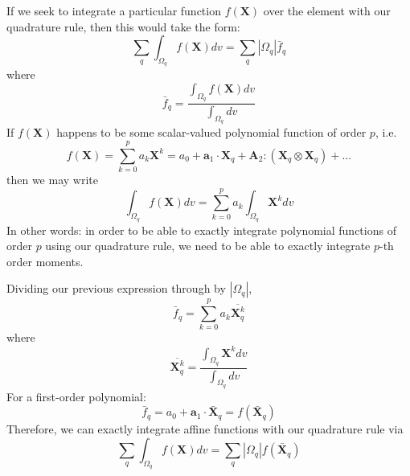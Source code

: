 \documentclass[11pt]{article} %
\begin{document}
If we seek to integrate a particular function $f(\mathbf{X})$ over the element with our quadrature rule, then this would take the form:
\begin{equation}
	\sum_q \int_{\Omega_q} f(\mathbf{X}) dv = \sum_q |\Omega_q| \bar{f}_q
\end{equation}
where
\begin{equation}
	\bar{f}_q = \frac{\int_{\Omega_q} f(\mathbf{X}) dv}{\int_{\Omega_q} dv}
\end{equation}
If $f(\mathbf{X})$ happens to be some scalar-valued polynomial function of order $p$, i.e.
\begin{equation}
	f(\mathbf{X}) = \sum_{k = 0}^{p} a_k \mathbf{X}^k = a_0 + \mathbf{a}_1 \cdot \mathbf{X}_q + \mathbf{A}_2 \colon (\mathbf{X}_q \otimes \mathbf{X}_q) + \ldots
\end{equation}
then we may write
\begin{equation}
	\int_{\Omega_q} f(\mathbf{X}) dv = \sum_{k = 0}^{p} a_k \int_{\Omega_q} \mathbf{X}^k dv
\end{equation}
In other words: in order to be able to exactly integrate polynomial functions of order $p$ using our quadrature rule, we need to be able to exactly integrate $p$-th order moments.

Dividing our previous expression through by $| \Omega_q |$,
\begin{equation}
	\bar{f}_q = \sum_{k = 0}^{p} a_k \overline{\mathbf{X}^k_q}
\end{equation}
where
\begin{equation}
	\overline{\mathbf{X}^k_q} = \frac{\int_{\Omega_q} \mathbf{X}^k dv}{\int_{\Omega_q} dv}
\end{equation}
For a first-order polynomial:
\begin{equation}
	\bar{f}_q = a_0 + \mathbf{a}_1 \cdot \bar{\mathbf{X}}_q = f(\bar{\mathbf{X}}_q)
\end{equation}
Therefore, we can exactly integrate affine functions with our quadrature rule via
\begin{equation}
	\sum_q \int_{\Omega_q} f(\mathbf{X}) dv = \sum_q |\Omega_q| f(\bar{\mathbf{X}}_q)
\end{equation}
\end{document}

